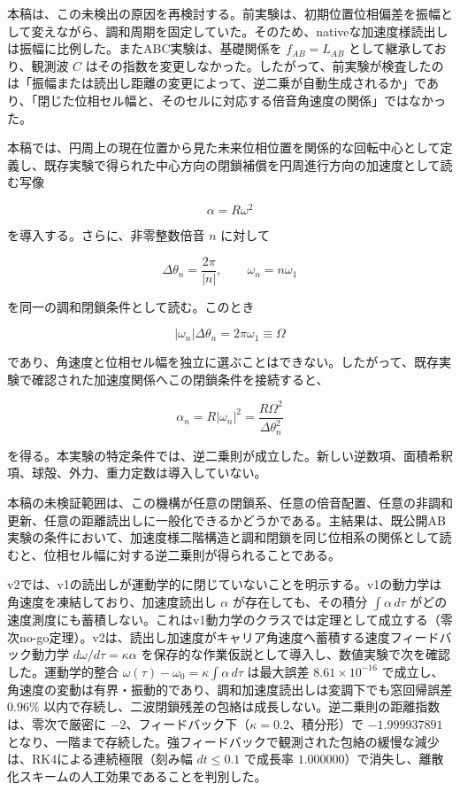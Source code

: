 \documentclass[
  a4paper,
]{ltjsarticle}
\begin{document}
本稿は、この未検出の原因を再検討する。前実験は、初期位置位相偏差を振幅として変えながら、調和周期を固定していた。そのため、nativeな加速度様読出しは振幅に比例した。またABC実験は、基礎関係を
\(f_{AB}=L_{AB}\) として継承しており、観測波 \(C\)
はその指数を変更しなかった。したがって、前実験が検査したのは「振幅または読出し距離の変更によって、逆二乗が自動生成されるか」であり、「閉じた位相セル幅と、そのセルに対応する倍音角速度の関係」ではなかった。

本稿では、円周上の現在位置から見た未来位相位置を関係的な回転中心として定義し、既存実験で得られた中心方向の閉鎖補償を円周進行方向の加速度として読む写像

\[
\alpha=R\omega^2
\]

を導入する。さらに、非零整数倍音 \(n\) に対して

\[
\Delta\theta_n=\frac{2\pi}{|n|},
\qquad
\omega_n=n\omega_1
\]

を同一の調和閉鎖条件として読む。このとき

\[
|\omega_n|\Delta\theta_n
=2\pi\omega_1
\equiv\Omega
\]

であり、角速度と位相セル幅を独立に選ぶことはできない。したがって、既存実験で確認された加速度関係へこの閉鎖条件を接続すると、

\[
\alpha_n
=R|\omega_n|^2
=\frac{R\Omega^2}{\Delta\theta_n^2}
\]

を得る。本実験の特定条件では、逆二乗則が成立した。新しい逆数項、面積希釈項、球殻、外力、重力定数は導入していない。

本稿の未検証範囲は、この機構が任意の閉鎖系、任意の倍音配置、任意の非調和更新、任意の距離読出しに一般化できるかどうかである。主結果は、既公開AB実験の条件において、加速度様二階構造と調和閉鎖を同じ位相系の関係として読むと、位相セル幅に対する逆二乗則が得られることである。

v2では、v1の読出しが運動学的に閉じていないことを明示する。v1の動力学は角速度を凍結しており、加速度読出し
\(\alpha\) が存在しても、その積分 \(\int\alpha\,d\tau\)
がどの速度測度にも蓄積しない。これはv1動力学のクラスでは定理として成立する（零次no-go定理）。v2は、読出し加速度がキャリア角速度へ蓄積する速度フィードバック動力学
\(d\omega/d\tau=\kappa\alpha\)
を保存的な作業仮説として導入し、数値実験で次を確認した。運動学的整合
\(\omega(\tau)-\omega_0=\kappa\int\alpha\,d\tau\) は最大誤差
\(8.61\times10^{-16}\)
で成立し、角速度の変動は有界・振動的であり、調和加速度読出しは変調下でも窓回帰誤差
\(0.96\%\)
以内で存続し、二波閉鎖残差の包絡は成長しない。逆二乗則の距離指数は、零次で厳密に
\(-2\)、フィードバック下（\(\kappa=0.2\)、積分形）で \(-1.999937891\)
となり、一階まで存続した。強フィードバックで観測された包絡の緩慢な減少は、RK4による連続極限（刻み幅
\(dt\le0.1\) で成長率
\(1.000000\)）で消失し、離散化スキームの人工効果であることを判別した。
\end{document}
